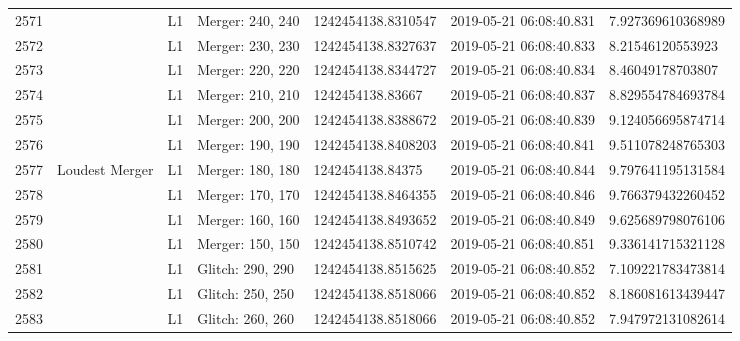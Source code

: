 \begin{longtable}{lllllll}
2571 &                                                    &       L1 &  Merger: 240, 240 &  1242454138.8310547 &  2019-05-21 06:08:40.831 &   7.927369610368989 \\
2572 &                                                    &       L1 &  Merger: 230, 230 &  1242454138.8327637 &  2019-05-21 06:08:40.833 &    8.21546120553923 \\
2573 &                                                    &       L1 &  Merger: 220, 220 &  1242454138.8344727 &  2019-05-21 06:08:40.834 &    8.46049178703807 \\
2574 &                                                    &       L1 &  Merger: 210, 210 &    1242454138.83667 &  2019-05-21 06:08:40.837 &   8.829554784693784 \\
2575 &                                                    &       L1 &  Merger: 200, 200 &  1242454138.8388672 &  2019-05-21 06:08:40.839 &   9.124056695874714 \\
2576 &                                                    &       L1 &  Merger: 190, 190 &  1242454138.8408203 &  2019-05-21 06:08:40.841 &   9.511078248765303 \\
2577 &                                     Loudest Merger &       L1 &  Merger: 180, 180 &    1242454138.84375 &  2019-05-21 06:08:40.844 &   9.797641195131584 \\
2578 &                                                    &       L1 &  Merger: 170, 170 &  1242454138.8464355 &  2019-05-21 06:08:40.846 &   9.766379432260452 \\
2579 &                                                    &       L1 &  Merger: 160, 160 &  1242454138.8493652 &  2019-05-21 06:08:40.849 &   9.625689798076106 \\
2580 &                                                    &       L1 &  Merger: 150, 150 &  1242454138.8510742 &  2019-05-21 06:08:40.851 &   9.336141715321128 \\
2581 &                                                    &       L1 &  Glitch: 290, 290 &  1242454138.8515625 &  2019-05-21 06:08:40.852 &   7.109221783473814 \\
2582 &                                                    &       L1 &  Glitch: 250, 250 &  1242454138.8518066 &  2019-05-21 06:08:40.852 &   8.186081613439447 \\
2583 &                                                    &       L1 &  Glitch: 260, 260 &  1242454138.8518066 &  2019-05-21 06:08:40.852 &   7.947972131082614 \\

\end{longtable}
